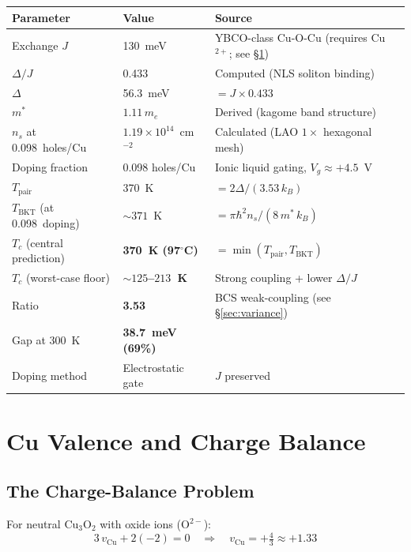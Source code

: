 \documentclass[11pt, a4paper]{article}
\begin{document}
\begin{center}
\begin{tabular}{@{}lll@{}}
\toprule
\textbf{Parameter} & \textbf{Value} & \textbf{Source} \\
\midrule
Exchange $J$ & 130~meV & YBCO-class Cu-O-Cu (requires Cu$^{2+}$;
  see \S\ref{sec:valence}) \\
$\Delta/J$ & 0.433 & Computed (NLS soliton binding) \\
$\Delta$ & 56.3~meV & $= J \times 0.433$ \\
$m^*$ & $1.11\,m_e$ & Derived (kagome band structure) \\
$n_s$ at 0.098~holes/Cu & $1.19 \times 10^{14}$~cm$^{-2}$ &
  Calculated (LAO $1\times$ hexagonal mesh) \\
Doping fraction & 0.098 holes/Cu & Ionic liquid gating,
  $V_g \approx +4.5$~V \\
\midrule
$T_{\text{pair}}$ & 370~K & $= 2\Delta/(3.53\,k_B)$ \\
$T_{\text{BKT}}$ (at 0.098~doping) & $\sim 371$~K &
  $= \pi\hbar^2 n_s/(8\,m^*\,k_B)$ \\
$T_c$ (central prediction) & \textbf{370~K (97$^\circ$C)} &
  $= \min(T_{\text{pair}}, T_{\text{BKT}})$ \\
$T_c$ (worst-case floor) & \textbf{$\sim 125$--$213$~K} &
  Strong coupling + lower $\Delta/J$ \\
Ratio & \textbf{3.53} & BCS weak-coupling
  (see \S\ref{sec:variance}) \\
Gap at 300~K & \textbf{38.7~meV (69\%)} & \\
Doping method & Electrostatic gate & $J$ preserved \\
\bottomrule
\end{tabular}
\end{center}

\tableofcontents

\section{Cu Valence and Charge Balance}
\label{sec:valence}

\subsection{The Charge-Balance Problem}

For neutral Cu$_3$O$_2$ with oxide ions ($\text{O}^{2-}$):
\[
  3\,v_{\text{Cu}} + 2(-2) = 0 \quad\Rightarrow\quad
  v_{\text{Cu}} = +\tfrac{4}{3} \approx +1.33
\]
\end{document}

